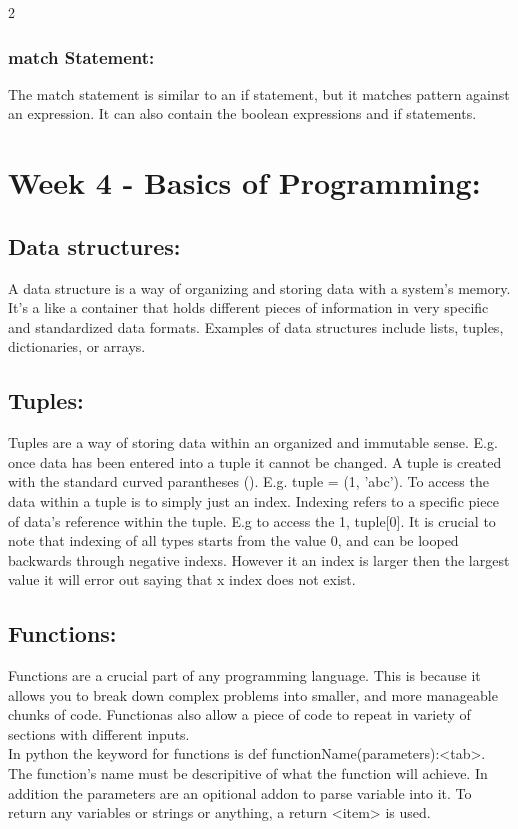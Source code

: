 \documentclass[a4paper]{report}
\begin{document}
\begin{flushleft}
\begin{multicols}{2}
	\subsubsection*{match Statement:}
	The match statement is similar to an if statement, but it matches pattern against an expression. It can also contain the boolean expressions and if statements.

	\section*{Week 4 - Basics of Programming:}
	\subsection*{Data structures:}
	A data structure is a way of organizing and storing data with a system's memory. It's a like a container that holds different pieces of information in very specific and standardized data formats. Examples of data structures include lists, tuples, dictionaries, or arrays.
	
	\subsection*{Tuples:}
	Tuples are a way of storing data within an organized and immutable sense. E.g. once data has been entered into a tuple it cannot be changed. A tuple is created with the standard curved parantheses (). E.g. tuple = (1, 'abc'). To access the data within a tuple is to simply just an index. Indexing refers to a specific piece of data's reference within the tuple. E.g to access the 1, tuple[0]. It is crucial to note that indexing of all types starts from the value 0, and can be looped backwards through negative indexs. However it an index is larger then the largest value it will error out saying that x index does not exist.

	\subsection*{Functions:}
	Functions are a crucial part of any programming language. This is because it allows you to break down complex problems into smaller, and more manageable chunks of code. Functionas also allow a piece of code to repeat in variety of sections with different inputs. \\
	In python the keyword for functions is def functionName(parameters):<tab>. The function's name must be descripitive of what the function will achieve. In addition the parameters are an opitional addon to parse variable into it. To return any variables or strings or anything, a return <item> is used.

\end{multicols}
\end{flushleft}
\end{document}
